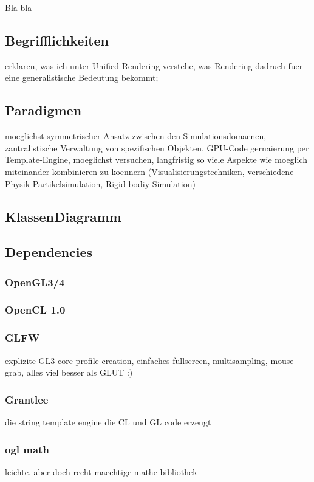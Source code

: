 Bla bla

\subsection{Begrifflichkeiten}
	erklaren, was ich unter Unified Rendering verstehe, was Rendering dadruch fuer eine generalistische Bedeutung bekommt;

\subsection{Paradigmen}
	
	moeglichst symmetrischer Ansatz zwischen den Simulationsdomaenen, zantralistische Verwaltung von spezifischen Objekten,
	GPU-Code gernaierung per Template-Engine, moeglichst versuchen, langfristig so viele Aspekte wie moeglich miteinander kombinieren zu koennern 	    
	(Visualisierungstechniken, verschiedene Physik Partikelsimulation, Rigid bodiy-Simulation) 

\subsection{KlassenDiagramm}

\subsection{Dependencies}

	
	\subsubsection{OpenGL3/4}
    \subsubsection{OpenCL 1.0}
    \subsubsection{GLFW}
    	explizite GL3 core profile creation, einfaches fullscreen, multisampling, mouse grab, alles viel besser als GLUT :)
    \subsubsection{Grantlee}
       die string template engine die CL und GL code erzeugt
    \subsubsection{ogl math}
    	leichte, aber doch recht maechtige mathe-bibliothek
    	
